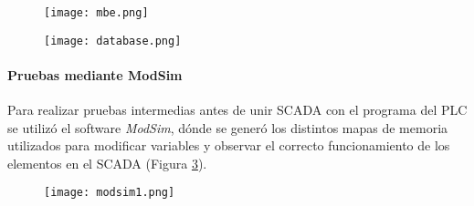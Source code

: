 \begin{figure}[h!]
	\centering
	\texttt{[image: mbe.png]}
	\label{fig:mbe}
\end{figure}
\begin{figure}[h!]
	\centering
	\texttt{[image: database.png]}
	\label{fig:database}
\end{figure}


\paragraph{Pruebas mediante ModSim}
Para realizar pruebas intermedias antes de unir SCADA con el programa del PLC se utilizó el software \textit{ModSim}, dónde se generó los distintos mapas de memoria utilizados para modificar variables y observar el correcto funcionamiento de los elementos en el SCADA (Figura \ref{fig:modsim1}).

\begin{figure}[h!]
	\centering
	\texttt{[image: modsim1.png]}
	\label{fig:modsim1}
\end{figure}





